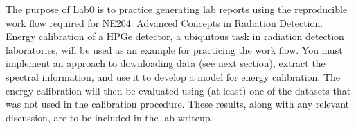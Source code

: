 The purpose of Lab0 is to practice generating lab reports using the reproducible work flow required for NE204: Advanced Concepts in Radiation Detection. Energy calibration of a HPGe detector, a ubiquitous task in radiation detection laboratories, will be used as an example for practicing the work flow. You must implement an approach to downloading data (see next section), extract the
spectral information, and use it to develop a model for energy calibration. The energy calibration
will then be evaluated using (at least) one of the datasets that was not used in the calibration
procedure. These results, along with any relevant discussion, are to be included in the lab writeup.
